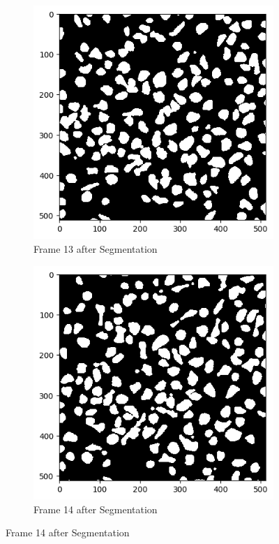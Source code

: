 \documentclass{article}
\begin{document}
\begin{figure}[h!]
  \centering
  \begin{subfigure}{0.4\textwidth}
    \includegraphics[width=\linewidth]{Report/Appendix_Images/Segmentation-B-Growth/frame_13.png}
    \caption*{Frame 13 after Segmentation}
  \end{subfigure}
  \hfill
  \begin{subfigure}{0.4\textwidth}
    \includegraphics[width=\linewidth]{Report/Appendix_Images/Segmentation-B-Growth/frame_14.png}
    \caption*{Frame 14 after Segmentation}
  \end{subfigure}


\end{figure}
\end{document}
